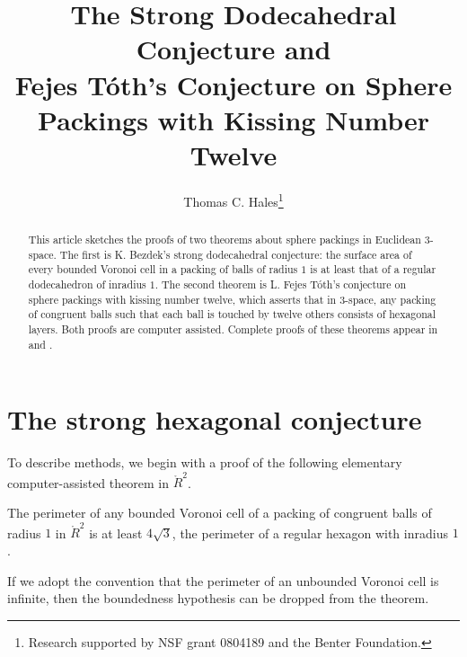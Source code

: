 \documentclass{llncs}
\begin{document}
\title{The Strong Dodecahedral Conjecture and\\ Fejes T\'oth's Conjecture on Sphere
Packings with Kissing Number Twelve}
\author{Thomas C. Hales\thanks{{Research supported by 
NSF grant 0804189 and the Benter Foundation.}}}
\maketitle


\begin{abstract}{} 
This article sketches the proofs of two theorems
  about sphere packings in Euclidean $3$-space.  The first is
  K. Bezdek's strong dodecahedral conjecture: the surface area of
  every bounded Voronoi cell in a packing of balls of radius $1$ is at
  least that of a regular dodecahedron of inradius $1$.  The second
  theorem is L. Fejes T\'oth's conjecture on sphere packings with
  kissing number twelve, which asserts that
  in $3$-space, any packing of congruent balls such that each ball is
  touched by twelve others consists of hexagonal layers.  Both proofs
  are computer assisted.  Complete proofs of these theorems appear in
  \cite{DSP} and \cite{FTK}.
\end{abstract}




\section{The strong hexagonal conjecture}

To describe methods, we begin with a proof of the following elementary
computer-assisted theorem in $\ring{R}^2$.

\begin{theorem} The perimeter of any bounded Voronoi cell of a packing
  of congruent balls of radius $1$ in $\ring{R}^2$ is at least
  $4\sqrt{3}$, the perimeter of a regular hexagon with inradius $1$.
\end{theorem}

If we adopt the convention that the perimeter of an unbounded Voronoi
cell is infinite, then the boundedness hypothesis can be dropped from
the theorem.
\end{document}
